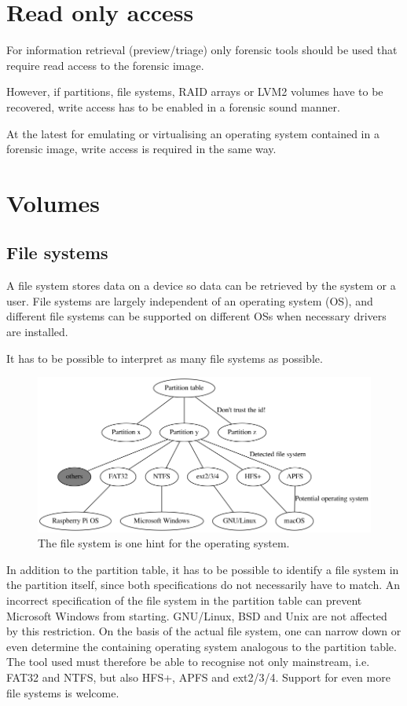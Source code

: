 \section{Read only access}
\label{sec:readonly}

For information retrieval (preview/triage) only forensic tools should be used that require read access to the forensic image.

However, if partitions, file systems, RAID arrays or LVM2 volumes have to be recovered, write access has to be enabled in a forensic sound manner.

At the latest for emulating or virtualising an operating system contained in a forensic image, write access is required in the same way.

\section{Volumes}
\label{sec:volumes}

\subsection{File systems}

A file system stores data on a device so data can be retrieved by the system or a user. File systems are largely independent of an operating system (OS), and different file systems can be supported on different OSs when necessary drivers are installed. \cite{Aarnes2017:160}

It has to be possible to interpret as many file systems as possible.

\begin{figure}[htbp]  %
  \centering
  \includegraphics[width=.5\textwidth]{figures/fs-vs-os.png}
  \caption[File system and operating system]{The file system is one hint for the operating system.}
  \label{fig:fsandos}
\end{figure}

In addition to the partition table, it has to be possible to identify a file system in the partition itself, since both specifications do not necessarily have to match. An incorrect specification of the file system in the partition table can prevent Microsoft Windows from starting. GNU/Linux, BSD and Unix are not affected by this restriction. On the basis of the actual file system, one can narrow down or even determine the containing operating system analogous to the partition table. The tool used must therefore be able to recognise not only mainstream, i.e. FAT32 and NTFS, but also HFS+, APFS and ext2/3/4. Support for even more file systems is welcome.


